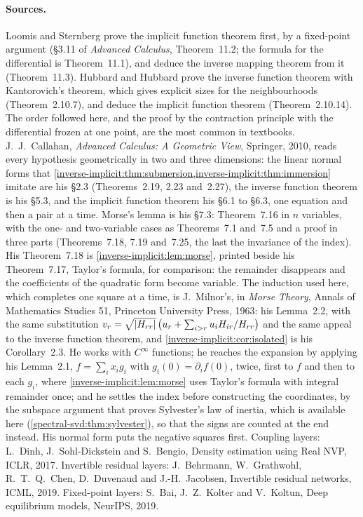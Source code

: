 \begin{notechapter}
\paragraph{Sources.} Loomis and Sternberg prove the implicit function
theorem first, by a fixed-point argument (\S3.11 of \emph{Advanced
Calculus}, Theorem~11.2; the formula for the differential is
Theorem~11.1), and deduce the inverse mapping theorem from it
(Theorem~11.3). Hubbard and Hubbard prove the inverse function theorem
with Kantorovich's theorem, which gives explicit sizes for the
neighbourhoods (Theorem~2.10.7), and deduce the implicit function
theorem (Theorem~2.10.14). The order followed here, and the proof by the
contraction principle with the differential frozen at one point, are the
most common in textbooks.
J.~J.~Callahan, \emph{Advanced Calculus: A Geometric View}, Springer,
2010, reads every hypothesis geometrically in two and three dimensions:
the linear normal forms that
\cref{inverse-implicit:thm:submersion,inverse-implicit:thm:immersion}
imitate are his \S2.3 (Theorems~2.19, 2.23 and~2.27), the inverse
function theorem is his \S5.3, and the implicit function theorem his
\S6.1 to \S6.3, one equation and then a pair at a time. Morse's lemma
is his \S7.3: Theorem~7.16 in $n$ variables, with the one- and
two-variable cases as Theorems~7.1 and~7.5 and a proof in three parts
(Theorems~7.18, 7.19 and~7.25, the last the invariance of the index).
His Theorem~7.18 is \cref{inverse-implicit:lem:morse}, printed beside
his Theorem~7.17, Taylor's formula, for comparison: the remainder
disappears and the coefficients of the quadratic form become variable.
The induction used
here, which completes one square at a time, is J.~Milnor's, in
\emph{Morse Theory}, Annals of Mathematics Studies 51, Princeton
University Press, 1963: his Lemma~2.2, with the same substitution
$v_r = \sqrt{\left|H_{rr}\right|}\,\bigl(u_r
+ \sum_{i>r}u_iH_{ir}/H_{rr}\bigr)$ and the same appeal to the inverse
function theorem, and \cref{inverse-implicit:cor:isolated} is his
Corollary~2.3. He works with $C^\infty$ functions; he reaches the
expansion by applying his Lemma~2.1, $f = \sum_ix_ig_i$ with
$g_i(0) = \partial_if(0)$, twice, first to $f$ and then to each $g_i$,
where \cref{inverse-implicit:lem:morse} uses Taylor's formula with
integral remainder once; and he settles the index before constructing
the coordinates, by the subspace argument that proves Sylvester's law
of inertia, which is available here
(\cref{spectral-svd:thm:sylvester}), so that the signs are counted at
the end instead. His normal form puts the negative squares first.
Coupling layers: L.~Dinh, J.~Sohl-Dickstein
and S.~Bengio, Density estimation using Real NVP, ICLR, 2017. Invertible
residual layers: J.~Behrmann, W.~Grathwohl, R.~T.~Q.~Chen, D.~Duvenaud
and J.-H.~Jacobsen, Invertible residual networks, ICML, 2019. Fixed-point
layers: S.~Bai, J.~Z.~Kolter and V.~Koltun, Deep equilibrium models,
NeurIPS, 2019.


\end{notechapter}
